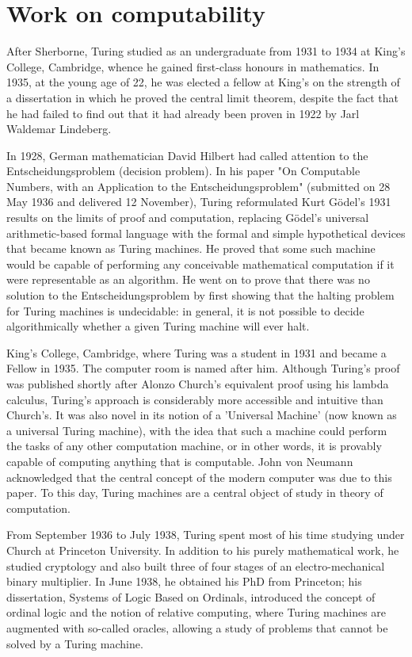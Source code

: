 \documentclass[a4paper,12pt]{article}
\begin{document}
\section{Work on computability}

After Sherborne, Turing studied as an undergraduate from 1931 to 1934 at King's College, Cambridge, whence he gained first-class honours in mathematics. In 1935, at the young age of 22, he was elected a fellow at King's on the strength of a dissertation in which he proved the central limit theorem, despite the fact that he had failed to find out that it had already been proven in 1922 by Jarl Waldemar Lindeberg.

In 1928, German mathematician David Hilbert had called attention to the Entscheidungsproblem (decision problem). In his paper "On Computable Numbers, with an Application to the Entscheidungsproblem" (submitted on 28 May 1936 and delivered 12 November), Turing reformulated Kurt Gödel's 1931 results on the limits of proof and computation, replacing Gödel's universal arithmetic-based formal language with the formal and simple hypothetical devices that became known as Turing machines. He proved that some such machine would be capable of performing any conceivable mathematical computation if it were representable as an algorithm. He went on to prove that there was no solution to the Entscheidungsproblem by first showing that the halting problem for Turing machines is undecidable: in general, it is not possible to decide algorithmically whether a given Turing machine will ever halt.

King's College, Cambridge, where Turing was a student in 1931 and became a Fellow in 1935. The computer room is named after him.
Although Turing's proof \cite{turing36} was published shortly after Alonzo Church's equivalent proof using his lambda calculus, Turing's approach is considerably more accessible and intuitive than Church's. It was also novel in its notion of a 'Universal Machine' (now known as a universal Turing machine), with the idea that such a machine could perform the tasks of any other computation machine, or in other words, it is provably capable of computing anything that is computable. John von Neumann acknowledged that the central concept of the modern computer was due to this paper. To this day, Turing machines are a central object of study in theory of computation.

From September 1936 to July 1938, Turing spent most of his time studying under Church at Princeton University. In addition to his purely mathematical work, he studied cryptology and also built three of four stages of an electro-mechanical binary multiplier. In June 1938, he obtained his PhD from Princeton; his dissertation, Systems of Logic Based on Ordinals, introduced the concept of ordinal logic and the notion of relative computing, where Turing machines are augmented with so-called oracles, allowing a study of problems that cannot be solved by a Turing machine.
\end{document}
